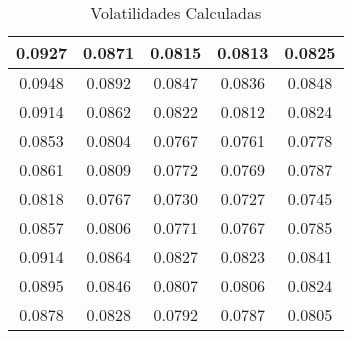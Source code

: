 \begin{table}                                
\centering                                   
\begin{tabular}{|c|c|c|c|c|}                 
\hline                                       
0.0927 & 0.0871 & 0.0815 & 0.0813 & 0.0825 \\
\hline                                       
0.0948 & 0.0892 & 0.0847 & 0.0836 & 0.0848 \\
\hline                                       
0.0914 & 0.0862 & 0.0822 & 0.0812 & 0.0824 \\
\hline                                       
0.0853 & 0.0804 & 0.0767 & 0.0761 & 0.0778 \\
\hline                                       
0.0861 & 0.0809 & 0.0772 & 0.0769 & 0.0787 \\
\hline                                       
0.0818 & 0.0767 & 0.0730 & 0.0727 & 0.0745 \\
\hline                                       
0.0857 & 0.0806 & 0.0771 & 0.0767 & 0.0785 \\
\hline                                       
0.0914 & 0.0864 & 0.0827 & 0.0823 & 0.0841 \\
\hline                                       
0.0895 & 0.0846 & 0.0807 & 0.0806 & 0.0824 \\
\hline                                       
0.0878 & 0.0828 & 0.0792 & 0.0787 & 0.0805 \\
\hline                                       
\end{tabular}                                
\caption{Volatilidades Calculadas}                     
\label{table:MyTableLabel}                   
\end{table}     

